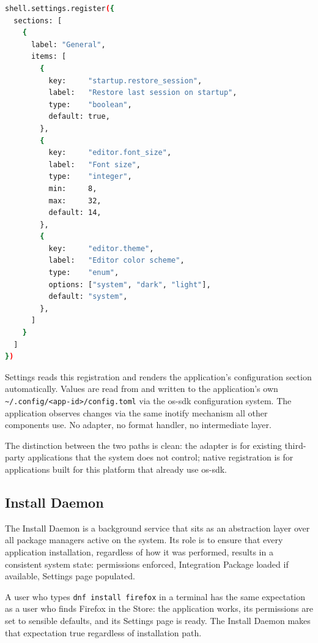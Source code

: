 \begin{lstlisting}[language=bash, caption={Native Settings registration via os-sdk (TypeScript)}]
shell.settings.register({
  sections: [
    {
      label: "General",
      items: [
        {
          key:     "startup.restore_session",
          label:   "Restore last session on startup",
          type:    "boolean",
          default: true,
        },
        {
          key:     "editor.font_size",
          label:   "Font size",
          type:    "integer",
          min:     8,
          max:     32,
          default: 14,
        },
        {
          key:     "editor.theme",
          label:   "Editor color scheme",
          type:    "enum",
          options: ["system", "dark", "light"],
          default: "system",
        },
      ]
    }
  ]
})
\end{lstlisting}

Settings reads this registration and renders the application's configuration
section automatically. Values are read from and written to the application's
own \texttt{\textasciitilde/.config/<app-id>/config.toml} via the os-sdk
configuration system. The application observes changes via the same inotify
mechanism all other components use. No adapter, no format handler, no
intermediate layer.

The distinction between the two paths is clean: the adapter is for existing
third-party applications that the system does not control; native registration
is for applications built for this platform that already use os-sdk.

\subsection{Install Daemon}
\label{sec:install-daemon}

The Install Daemon is a background service that sits as an abstraction layer
over all package managers active on the system. Its role is to ensure that
every application installation, regardless of how it was performed, results in
a consistent system state: permissions enforced, Integration Package loaded
if available, Settings page populated.

A user who types \texttt{dnf install firefox} in a terminal has the same
expectation as a user who finds Firefox in the Store: the application works,
its permissions are set to sensible defaults, and its Settings page is ready.
The Install Daemon makes that expectation true regardless of installation path.

